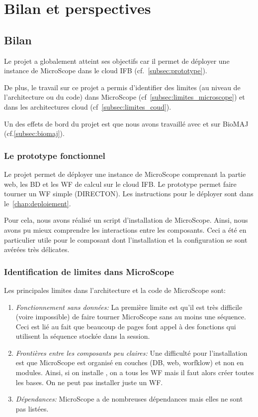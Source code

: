 \chapter{Bilan et perspectives}

\section{Bilan}

Le projet a globalement atteint ses objectifs car il permet de déployer une instance de MicroScope dans le cloud IFB (cf.~\autoref{subsec:prototype}).

De plus, le travail sur ce projet a permis d'identifier des limites (au niveau de l'architecture ou du code) dans MicroScope (cf~\autoref{subsec:limites_microscope})
et dans les architectures cloud (cf~\autoref{subsec:limites_coud}).

Un des effets de bord du projet est que nous avons travaillé avec et sur BioMAJ (cf.\autoref{subsec:biomaj}).

\subsection{Le prototype fonctionnel} \label{subsec:prototype}

Le projet permet de déployer une instance de MicroScope
comprenant la partie web, les BD et les WF de calcul
sur le cloud IFB.
Le prototype permet faire tourner un WF simple (DIRECTON).
Les instructions pour le déployer sont dans le~\autoref{chap:deploiement}.

Pour cela, nous avons réalisé un script d'installation de MicroScope.
Ainsi, nous avons pu mieux comprendre les interactions entre les composants.
Ceci a été en particulier utile pour le composant  dont l'installation et la configuration
se sont avérées très délicates.

\subsection{Identification de limites dans MicroScope} \label{subsec:limites_microscope}

Les principales limites dans l'architecture et la code de MicroScope sont:
\begin{enumerate}
	\item \emph{Fonctionnement sans données:} La première limite est
	qu'il est très difficile (voire impossible) de faire tourner MicroScope sans au moins une séquence.
	Ceci est lié au fait que beaucoup de pages font appel à des fonctions qui utilisent la séquence stockée dans la session.
	\item \emph{Frontières entre les composants peu claires:} Une difficulté pour l'installation est que MicroScope est organisé en couches (DB, web, worfklow) et non en modules.
	Ainsi, si on installe , on a tous les WF mais il faut alors créer toutes les bases.
	On ne peut pas installer juste un WF.
	\item \emph{Dépendances:} MicroScope a de nombreuses dépendances mais elles ne sont pas listées.
\end{enumerate}

